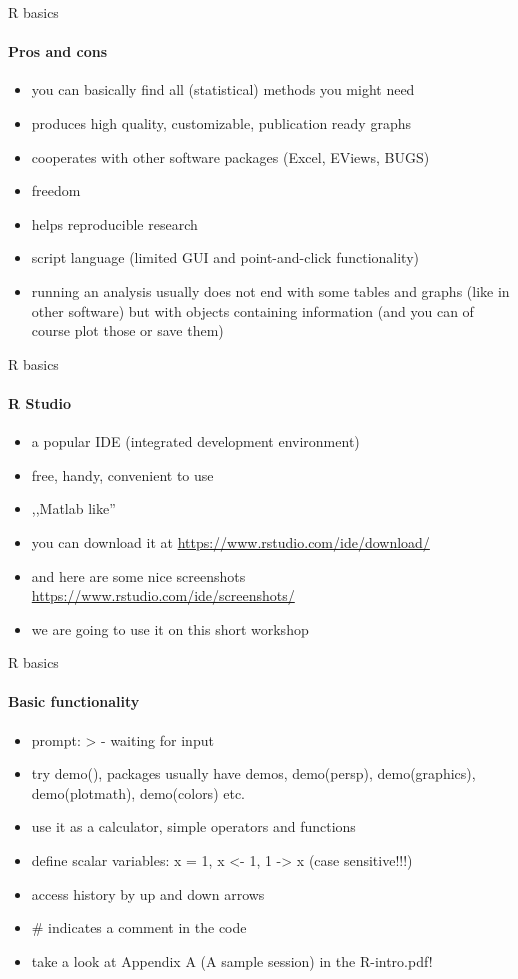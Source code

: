 \documentclass[10pt]{beamer}
\begin{document}
\begin{frame}{R basics}
\framesubtitle{Pros and cons}
\begin{itemize}
\item you can basically find all (statistical) methods you might need
\item produces high quality, customizable, publication ready graphs
\item cooperates with other software packages (Excel, EViews, BUGS)
\item freedom
\item helps reproducible research
\item script language (limited GUI and point-and-click functionality)
\item running an analysis usually does not end with some tables and graphs (like in other software) but with objects containing information (and you can of course plot those or save them)
\end{itemize}
\end{frame}

\begin{frame}{R basics}
\framesubtitle{R Studio}
\begin{itemize}
\item a popular IDE (integrated development environment)
\item free, handy, convenient to use
\item ,,Matlab like''
\item you can download it at \textcolor{blue}{\url{https://www.rstudio.com/ide/download/}}
\item and here are some nice screenshots \textcolor{blue}{\url{https://www.rstudio.com/ide/screenshots/}}
\item we are going to use it on this short workshop
\end{itemize}
\end{frame}

\begin{frame}{R basics}
\framesubtitle{Basic functionality}
\begin{itemize}
\item prompt: > - waiting for input
\item try demo(), packages usually have demos, demo(persp), demo(graphics), demo(plotmath), demo(colors) etc.
\item use it as a calculator, simple operators and functions
\item define scalar variables: x = 1, x <- 1, 1 -> x (case sensitive!!!)
\item access history by up and down arrows
\item \# indicates a comment in the code
\item take a look at Appendix A (A sample session) in the R-intro.pdf!
\end{itemize}
\end{frame}
\end{document}

